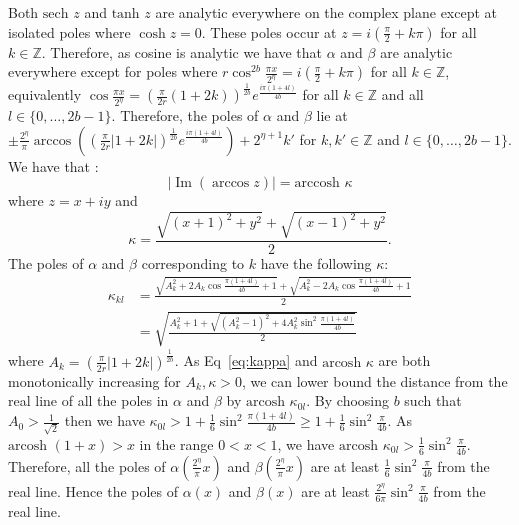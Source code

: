 \documentclass[aps,floatfix,10pt,amssymb,amsfont,amsmath,superscriptaddress,float,nofootinbib,longbibliography,nobalancelastpage,twocolumn]{revtex4-2}
\begin{document}
Both $\text{sech } z$ and $\text{tanh } z$ are analytic everywhere on the complex plane except at isolated poles where $\cosh z = 0$. These poles occur at $z = i(\frac{\pi}{2} + k \pi)$ for all $k \in \mathbb{Z}$. Therefore, as cosine is analytic we have that $\alpha$ and $\beta$ are analytic everywhere except for poles where $r \cos^{2b}\frac{\pi x}{2^{\eta}} = i(\frac{\pi}{2} + k \pi)$ for all $k \in \mathbb{Z}$, equivalently $\cos \frac{\pi x}{2^{\eta}} = (\frac{\pi}{2r}(1+2k))^{\frac{1}{2b}} e^{\frac{i\pi(1+4l)}{4b}}$  for all $k \in \mathbb{Z}$ and all $l \in \{0,\ldots,2b-1\}$. Therefore, the poles of $\alpha$ and $\beta$ lie at $\pm\frac{2^{\eta}}{\pi}\arccos ((\frac{\pi}{2r}|1+2k|)^{\frac{1}{2b}}e^{\frac{i\pi(1+4l)}{4b}}) + 2^{\eta+1} k'$ for $k, k' \in \mathbb{Z}$ and $l \in \{0,\ldots,2b-1\}$. We have that \cite[\href{http://dlmf.nist.gov/4.23.E35}{4.23.35}]{NIST:DLMF}:
\begin{equation}
    |\operatorname{Im}(\arccos z)| = \text{arccosh }{\kappa}
\end{equation}
where $z=x+iy$ and
\begin{equation}
    \kappa = \frac{\sqrt{(x+1)^2 + y^2} + \sqrt{(x-1)^2+y^2}}{2}.
\end{equation}
The poles of $\alpha$ and $\beta$ corresponding to $k$ have the following $\kappa$:
\begin{align}
    \kappa_{kl} &= \frac{\sqrt{A_k^2 + 2A_k\cos \frac{\pi(1+4l)}{4b}+1} +\sqrt{A_k^2 - 2A_k\cos \frac{\pi(1+4l)}{4b}+1}}{2}\\
    &= \sqrt{\frac{A_k^2+1 + \sqrt{(A_k^2-1)^2+4A_k^2\sin^2\frac{\pi(1+4l)}{4b}}}{2}}
    \label{eq:kappa}
\end{align}
where $A_k = (\frac{\pi}{2r}|1+2k|)^{\frac{1}{2b}}$.  As Eq~\eqref{eq:kappa} and $\text{arcosh } \kappa$ are both monotonically increasing for $A_k, \kappa>0$, we can lower bound the distance from the real line of all the poles in $\alpha$ and $\beta$ by $\text{arcosh } \kappa_{0l}$. By choosing $b$ such that $A_0 > \frac{1}{\sqrt{2}}$ then we have $\kappa_{0l} > 1 + \frac{1}{6}\sin^2\frac{\pi(1+4l)}{4b} \geq 1 + \frac{1}{6}\sin^2\frac{\pi}{4b}$. As $\text{arcosh } (1+x) > x$ in the range $0<x<1$, we have $\text{arcosh } \kappa_{0l} > \frac{1}{6}\sin^2\frac{\pi}{4b}$. Therefore, all the poles of $\alpha(\frac{2^{\eta}}{\pi}x)$ and $\beta(\frac{2^{\eta}}{\pi}x)$ are at least $\frac{1}{6}\sin^2\frac{\pi}{4b}$ from the real line. Hence the poles of $\alpha(x)$ and $\beta(x)$ are at least $\frac{2^{\eta}}{6\pi}\sin^2\frac{\pi}{4b}$ from the real line.
\end{document}

